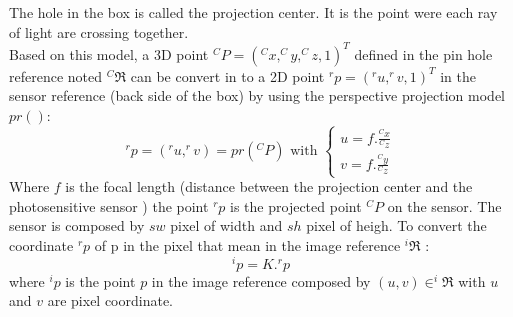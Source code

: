   
 
    
The hole in the box is called the projection center. It is the point were each ray of light are crossing together.  \\
Based on this model, a 3D point $^CP=(^Cx,^Cy,^Cz,1)^T$ defined in the pin hole reference noted $ ^C\Re$ can be convert in to a 2D point  $^rp=(^ru,^rv,1)^T$ in the sensor reference (back side of the box) by using  the perspective projection model $pr() $: 
\begin{equation}
^rp=(^ru,^rv)= pr(^CP) \mbox{ with } \begin{cases} u= f.\frac{^Cx}{^Cz} \\  v= f.\frac{^Cy}{^Cz} 
\end{cases} 
\end{equation}
Where $f$ is the focal length (distance between the projection center and the photosensitive sensor )
the point $^rp$ is the projected point $^CP$ on the sensor. The sensor is composed by $sw$ pixel of width and $sh$  pixel of  heigh. To convert the coordinate $^rp$ of p in the pixel  that mean in the image reference $^i\Re$ : 
\begin{equation}
^ip=K. ^rp
\end{equation}
where $^ip$  is the point $p$ in the image reference composed by $(u,v) \in ^i\Re$ with $u$ and $v$ are  pixel coordinate. 




